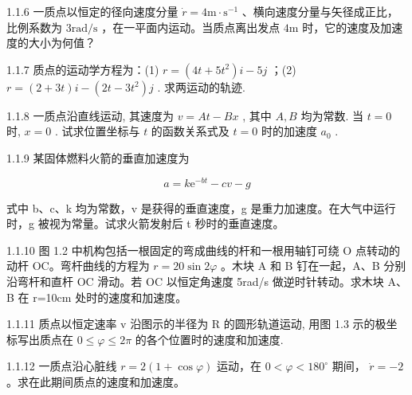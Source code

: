 \begin{problem}{1.1.6}
一质点以恒定的径向速度分量 $\dot{r} = 4\mathrm{m}\cdot \mathrm{s}^{-1}$ 、横向速度分量与矢径成正比，比例系数为 $3\mathrm{rad / s}$ ，在一平面内运动。当质点离出发点 $4\mathrm{m}$ 时，它的速度及加速度的大小为何值？
\end{problem}
\clearpage


\begin{problem}{1.1.7}
质点的运动学方程为：(1) $r = (4t + 5t^2)i - 5j$ ；(2) $r = (2 + 3t)i - (2t - 3t^2)j$ . 求两运动的轨迹.
\end{problem}
\clearpage


\begin{problem}{1.1.8}
一质点沿直线运动, 其速度为 $v = A t - B x$ , 其中 $A, B$ 均为常数. 当 $t = 0$ 时, $x = 0$ . 试求位置坐标与 $t$ 的函数关系式及 $t = 0$ 时的加速度 $a_0$ .
\end{problem}
\clearpage


\begin{problem}{1.1.9}
某固体燃料火箭的垂直加速度为

\[
a = k \mathrm{e} ^ {- b t} - c v - g
\]

式中 b、c、k 均为常数，v 是获得的垂直速度，g 是重力加速度。在大气中运行时，g 被视为常量。试求火箭发射后 t 秒时的垂直速度。
\end{problem}
\clearpage


\begin{problem}{1.1.10}
图 1.2 中机构包括一根固定的弯成曲线的杆和一根用轴钉可绕 O 点转动的动杆 OC。弯杆曲线的方程为 $r=20\sin2\varphi$ 。木块 A 和 B 钉在一起，A、B 分别沿弯杆和直杆 OC 滑动。若 OC 以恒定角速度 5rad/s 做逆时针转动。求木块 A、B 在 r=10cm 处时的速度和加速度。
\begin{center}

\end{center}
\end{problem}
\clearpage


\begin{problem}{1.1.11}
质点以恒定速率 v 沿图示的半径为 R 的圆形轨道运动, 用图 1.3 示的极坐标写出质点在 $0 \leqslant \varphi \leqslant 2\pi$ 的各个位置时的速度和加速度.
\begin{center}

\end{center}
\end{problem}
\clearpage


\begin{problem}{1.1.12}
一质点沿心脏线 $r = 2(1 + \cos \varphi)$ 运动，在 $0 < \varphi < 180^{\circ}$ 期间， $\dot{r} = -2$ 。求在此期间质点的速度和加速度。
\end{problem}
\clearpage


